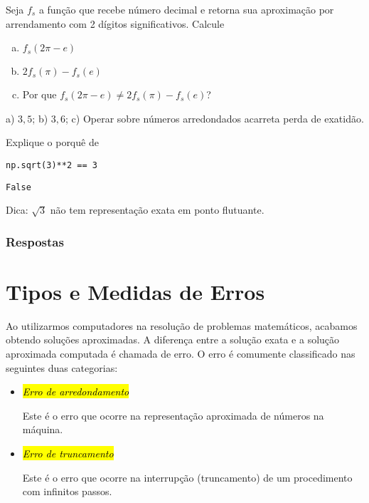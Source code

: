 \begin{exer}
  Seja $f_s$ a função que recebe número decimal e retorna sua aproximação por arrendamento com 2 dígitos significativos. Calcule
  \begin{enumerate}[a)]
  \item $f_s(2\pi - e)$
  \item $2f_s(\pi) - f_s(e)$
  \item Por que $f_s(2\pi - e) \neq  2f_s(\pi) - f_s(e)$?
  \end{enumerate}
\end{exer}
\begin{resp}
  a) $3,5$; b) $3,6$; c) Operar sobre números arredondados acarreta perda de exatidão.
\end{resp}


\begin{exer}
  Explique o porquê de

\begin{lstlisting}
np.sqrt(3)**2 == 3
\end{lstlisting}

\begin{verbatim}
False
\end{verbatim}

\end{exer}
\begin{resp}
  Dica: $\sqrt{3}$ não tem representação exata em ponto flutuante.
\end{resp}

\ifisbook
\subsubsection{Respostas}
\shipoutAnswer
\fi


\section{Tipos e Medidas de Erros}\label{cap_aritm_sec_erros}

Ao utilizarmos computadores na resolução de problemas matemáticos, acabamos obtendo soluções aproximadas. A diferença entre a solução exata e a solução aproximada computada é chamada de erro. O erro é comumente classificado nas seguintes duas categorias:
\begin{itemize}
\item \hl{\emph{Erro de arredondamento}}

  Este é o erro que ocorre na representação aproximada de números na máquina.
  
\item \hl{\emph{Erro de truncamento}}

  Este é o erro que ocorre na interrupção (truncamento) de um procedimento com infinitos passos.
\end{itemize}

